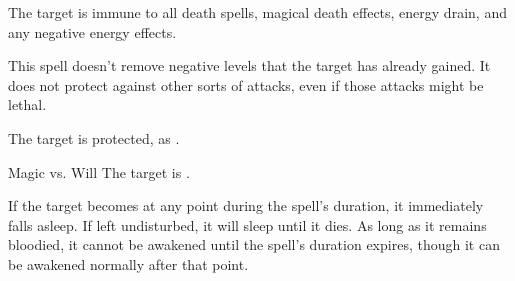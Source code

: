 \begin{spellheader}
    \spellrng{\rngclose}
    \spelldur{\durshort}
\end{spellheader}
\begin{spelleffects}
    \spelleffect The target is immune to all death spells, magical death effects, energy drain, and any negative energy effects.
\end{spelleffects}
\begin{spellfooter}
    \spellnotes This spell doesn't remove negative levels that the target has already gained. It does not protect against other sorts of attacks, even if those attacks might be lethal.
\end{spellfooter}

\begin{spellheader}
    \spelldur{\durshort}
\end{spellheader}
\begin{spelleffects}
    \spelleffect The target is protected, as .
\end{spelleffects}
\begin{spellfooter}

\end{spellfooter}

\begin{spellheader}
    \spellrng{\rngmed}
    \spelldur{\durlong}
\end{spellheader}
\begin{spelleffects}
    \begin{spellattack}{Magic vs. Will}
        \spellsuccess The target is \bewildered.

        If the target becomes \bloodied at any point during the spell's duration, it immediately falls asleep. If left undisturbed, it will sleep until it dies. As long as it remains bloodied, it cannot be awakened until the spell's duration expires, though it can be awakened normally after that point.
    \end{spellattack}
\end{spelleffects}
\begin{spellfooter}

\end{spellfooter}

